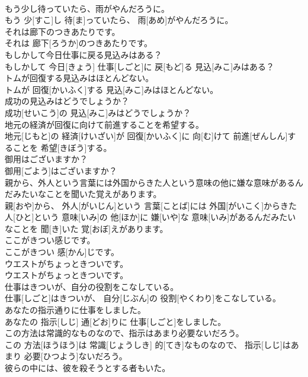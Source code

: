 \documentclass[8pt]{extreport}
\begin{document}
\begin{CJK}{UTF8}{min}
\\	もう少し待っていたら、雨がやんだろうに。	
\\	もう 少[すこ]し 待[ま]っていたら、 雨[あめ]がやんだろうに。	
\\	それは廊下のつきあたりです。	
\\	それは 廊下[ろうか]のつきあたりです。	
\\	もしかして今日仕事に戻る見込みはある？	
\\	もしかして 今日[きょう] 仕事[しごと]に 戻[もど]る 見込[みこ]みはある？	
\\	トムが回復する見込みはほとんどない。	
\\	トムが 回復[かいふく]する 見込[みこ]みはほとんどない。	
\\	成功の見込みはどうでしょうか？	
\\	成功[せいこう]の 見込[みこ]みはどうでしょうか？	
\\	地元の経済が回復に向けて前進することを希望する。	
\\	地元[じもと]の 経済[けいざい]が 回復[かいふく]に 向[む]けて 前進[ぜんしん]することを 希望[きぼう]する。	
\\	御用はございますか？	
\\	御用[ごよう]はございますか？	
\\	親から、外人という言葉には外国からきた人という意味の他に嫌な意味があるんだみたいなことを聞いた覚えがあります。	
\\	親[おや]から、 外人[がいじん]という 言葉[ことば]には 外国[がいこく]からきた 人[ひと]という 意味[いみ]の 他[ほか]に 嫌[いや]な 意味[いみ]があるんだみたいなことを 聞[き]いた 覚[おぼ]えがあります。	
\\	ここがきつい感じです。	
\\	ここがきつい 感[かん]じです。	
\\	ウエストがちょっときついです。	
\\	ウエストがちょっときついです。	
\\	仕事はきついが、自分の役割をこなしている。	
\\	仕事[しごと]はきついが、 自分[じぶん]の 役割[やくわり]をこなしている。	
\\	あなたの指示通りに仕事をしました。	
\\	あなたの 指示[しじ] 通[どお]りに 仕事[しごと]をしました。	
\\	この方法は常識的なものなので、指示はあまり必要ないだろう。	
\\	この 方法[ほうほう]は 常識[じょうしき] 的[てき]なものなので、 指示[しじ]はあまり 必要[ひつよう]ないだろう。	
\\	彼らの中には、彼を殺そうとする者もいた。	

\end{CJK}
\end{document}
